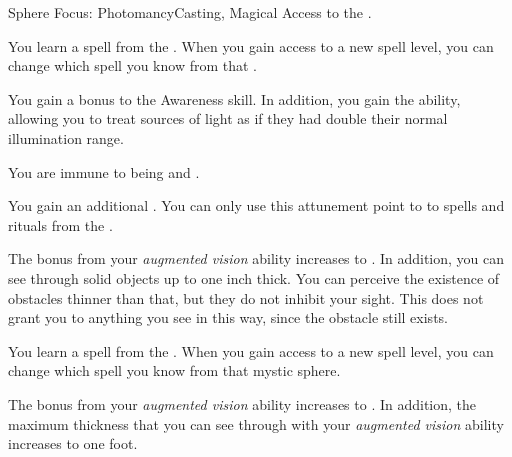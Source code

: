     \begin{feat}{Sphere Focus: Photomancy}{Casting, Magical}
        \featpre Access to the  .

         You learn a spell from the  .
        When you gain access to a new spell level, you can change which spell you know from that .

         You gain a  bonus to the Awareness skill.
        In addition, you gain the  ability, allowing you to treat sources of light as if they had double their normal illumination range.

         You are immune to being  and .

         You gain an additional .
        You can only use this attunement point to  to spells and rituals from the  .

         The bonus from your \textit{augmented vision} ability increases to .
        In addition, you can see through solid objects up to one inch thick.
        You can perceive the existence of obstacles thinner than that, but they do not inhibit your sight.
        This does not grant you  to anything you see in this way, since the obstacle still exists.

         You learn a spell from the  .
        When you gain access to a new spell level, you can change which spell you know from that mystic sphere.

         The bonus from your \textit{augmented vision} ability increases to .
        In addition, the maximum thickness that you can see through with your \textit{augmented vision} ability increases to one foot.
    \end{feat}


